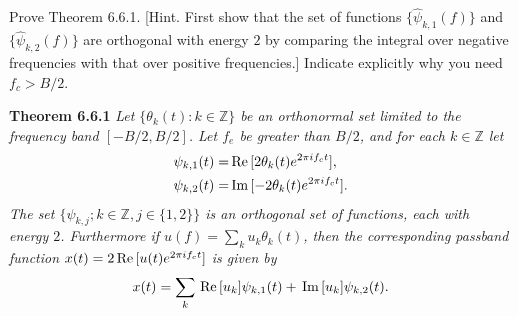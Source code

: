 \documentclass{assignment}
\begin{document}
\begin{prob} Prove Theorem 6.6.1. [Hint. First show that the set of functions $\{\hat{\psi}_{k,1}(f)\}$ and $\{\hat{\psi}_{k,2}(f)\}$ are orthogonal with energy $2$ by comparing the integral over negative frequencies with that over positive frequencies.] Indicate explicitly why you need $f_c>B/2$.

    \begin{framed}
        \textbf{Theorem 6.6.1} \itshape Let $\{\theta_k(t):k\in\mathbb{Z}\}$ be an orthonormal set limited to the frequency band $[-B/2,B/2]$. Let $f_e$ be greater than $B/2$, and for each $k\in\mathbb{Z}$ let
        \begin{align*}
            \psi_{k,1}(t)=&\,\text{Re}\,[2\theta_k(t)e^{2\pi if_ct}],\\
            \psi_{k,2}(t)=&\,\text{Im}\,[-2\theta_k(t)e^{2\pi if_ct}].
        \end{align*}
        The set $\{\psi_{k,j};k\in\mathbb{Z},j\in\{1,2\}\}$ is an orthogonal set of functions, each with energy $2$. Furthermore if $u(f)=\sum_ku_k\theta_k(t)$, then the corresponding passband function $x(t)=2\,\text{Re}\,[u(t)e^{2\pi if_ct}]$ is given by
        \[
            x(t)=\sum_k\,\text{Re}\,[u_k]\psi_{k,1}(t)+\,\text{Im}\,[u_k]\psi_{k,2}(t).
        \]
    \end{framed}
\end{prob}
\begin{sol}
\end{sol}
\end{document}
